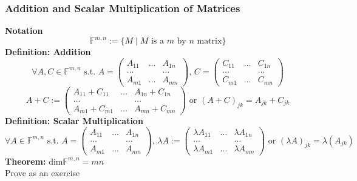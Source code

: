 \documentclass{article}
\newcommand{\F}{\mathbb{F}}
\newcommand{\st}{\mbox{ s.t. }}
\newcommand{\0}{{\bf{0}}}
\begin{document}
\subsubsection{Addition and Scalar Multiplication of Matrices}
\textbf{Notation}
$$\F^{m,n}:=\{M\mid M\mbox{ is a $m$ by $n$ matrix}\}$$
\textbf{Definition: Addition}
$$\forall A,C\in\F^{m,n}\st A=\begin{pmatrix}
    A_{11}&\dots&A_{1n}\\
    \dots&&\dots\\
    A_{m1}&\dots&A_{mn}
\end{pmatrix},\,C=\begin{pmatrix}
    C_{11}&\dots&C_{1n}\\
    \dots&&\dots\\
    C_{m1}&\dots&C_{mn}
\end{pmatrix}$$
$$A+C:=\begin{pmatrix}
    A_{11}+C_{11}&\dots&A_{1n}+C_{1n}\\
    \dots&&\dots\\
    A_{m1}+C_{m1}&\dots&A_{mn}+C_{mn}
\end{pmatrix}\mbox{ or }(A+C)_{jk}=A_{jk}+C_{jk}$$
\textbf{Definition: Scalar Multiplication}
$$\forall A\in\F^{m,n}\st A=\begin{pmatrix}
    A_{11}&\dots&A_{1n}\\
    \dots&&\dots\\
    A_{m1}&\dots&A_{mn}
\end{pmatrix},\,\lambda A:=\begin{pmatrix}
    \lambda A_{11}&\dots&\lambda A_{1n}\\
    \dots&&\dots\\
    \lambda A_{m1}&\dots&\lambda A_{mn}
\end{pmatrix}\mbox{ or }(\lambda A)_{jk}=\lambda(A_{jk})$$
\textbf{Theorem:} $\mbox{dim}\F^{m,n}=mn$\\
\null\hfill{Prove as an exercise}
\end{document}
